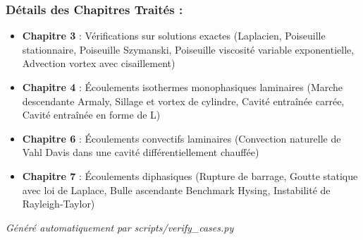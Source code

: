 \subsubsection{Détails des Chapitres Traités
:}\label{duxe9tails-des-chapitres-traituxe9s}

\begin{itemize}
\tightlist
\item
  \textbf{Chapitre 3} : Vérifications sur solutions exactes (Laplacien,
  Poiseuille stationnaire, Poiseuille Szymanski, Poiseuille viscosité
  variable exponentielle, Advection vortex avec cisaillement)
\item
  \textbf{Chapitre 4} : Écoulements isothermes monophasiques laminaires
  (Marche descendante Armaly, Sillage et vortex de cylindre, Cavité
  entraînée carrée, Cavité entraînée en forme de L)
\item
  \textbf{Chapitre 6} : Écoulements convectifs laminaires (Convection
  naturelle de Vahl Davis dans une cavité différentiellement chauffée)
\item
  \textbf{Chapitre 7} : Écoulements diphasiques (Rupture de barrage,
  Goutte statique avec loi de Laplace, Bulle ascendante Benchmark
  Hysing, Instabilité de Rayleigh-Taylor)
\end{itemize}

\emph{Généré automatiquement par scripts/verify\_cases.py}
